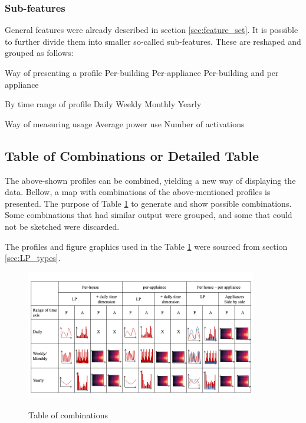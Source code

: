 \subsubsection{Sub-features} \label{sec:subfeatures}

General features were already described in section \ref{sec:feature_set}.
It is possible to further divide them into smaller so-called sub-features.
These are reshaped and grouped as follows:
\begin{outline}

\1 Way of presenting a profile
\2 Per-building 
\2 Per-appliance 
\2 Per-building and per appliance

\1 By time range of profile 
\2 Daily
\2 Weekly
\2 Monthly
\2 Yearly

\1 Way of measuring usage
\2 Average power use 
\2 Number of activations
\end{outline}


\subsection{Table of Combinations or Detailed Table}

The above-shown profiles can be combined, yielding a new way of displaying the data.
Bellow, a map with combinations of the above-mentioned profiles is presented. 
The purpose of Table \ref{fig:map_fig} to generate and show possible combinations.
Some combinations that had similar output were grouped, and some that could not be sketched were discarded. 

The profiles and figure graphics used in the Table \ref{fig:map_fig} were sourced from section \ref{sec:LP_types}.

\begin{figure}[H]
	\centering
	\caption{Table of combinations}
	\includegraphics[width=0.9\textwidth]{Figures/profile_sketches/Slide14.png}
	\label{fig:map_fig}
\end{figure}

